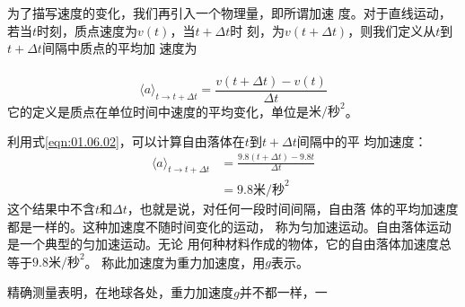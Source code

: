 \section[加速度]{}\label{sec:01.08}

为了描写速度的变化，我们再引入一个物理量，即所谓加速
度。对于直线运动，若当$t$时刻，质点速度为$v\left(t\right)$，当$t+\Delta t$时
刻，为$v\left(t+\Delta t\right)$，则我们定义从$t$到$t+\Delta t$间隔中质点的平均加
速度为\\~\vspace{-2em}
\begin{equation}\label{eqn:01.08.01}
  \langle a\rangle_{t\rightarrow t+\Delta t} = \frac{v\left(t+\Delta t\right)-v\left(t\right)}{\Delta t}
\end{equation}
它的定义是质点在单位时间中速度的平均变化，单位是$\text{米/秒}^2$。

利用式\eqref{eqn:01.06.02}，可以计算自由落体在$t$到$t+\Delta t$间隔中的平
均加速度：\vspace{-1em}
\begin{equation*}
  \begin{aligned}
    \langle a\rangle_{t\rightarrow t+\Delta t} & = \frac{9.8\left(t+\Delta t\right)-9.8t}{\Delta t} \\
                                               & = 9.8\text{米/秒}^2
  \end{aligned}
\end{equation*}
这个结果中不含$t$和$\Delta t$，也就是说，对任何一段时间间隔，自由落
体的平均加速度都是一样的。这种加速度不随时间变化的运动，
称为匀加速运动。自由落体运动是一个典型的匀加速运动。无论
用何种材料作成的物体，它的自由落体加速度总等于$9.8\text{米/秒}^2$。
称此加速度为重力加速度，用$g$表示。

精确测量表明，在地球各处，重力加速度$g$并不都一样，一

\mbox{}

